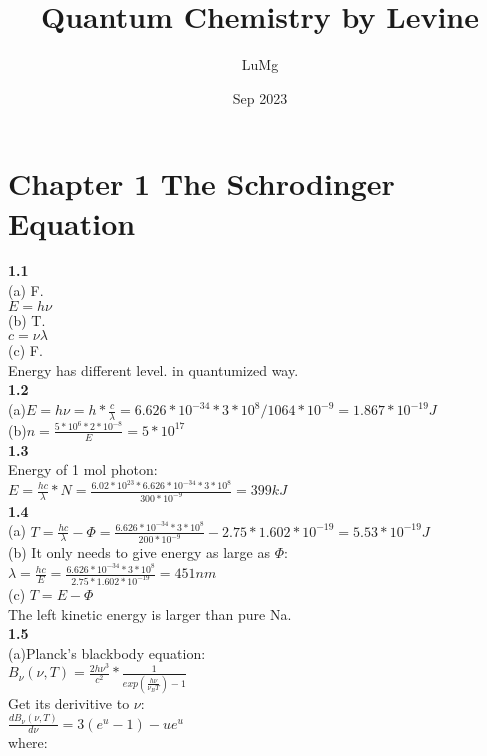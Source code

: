 \documentclass{article}
\title{Quantum Chemistry by Levine}
\author{LuMg}
\date{Sep 2023}
\begin{document}
\maketitle

\section{Chapter 1 The Schrodinger Equation}
\textbf{1.1}\\
(a) F.\\ 
$E = h\nu$\\
(b) T.\\
$c = \nu \lambda$\\
(c) F.\\
Energy has different level. in quantumized way.\\
\newline
\textbf{1.2}\\
(a)$E = h\nu = h*\frac{c}{\lambda} = 6.626*10^{-34}*3*10^8 / 1064*10^{-9} = 1.867*10^{-19}J$\\
(b)$n = \frac{5*10^6*2*10^{-8}}{E} = 5*10^{17}$\\
\newline
\textbf{1.3}\\
Energy of 1 mol photon:\\
$E = \frac{hc}{\lambda}*N = \frac{6.02*10^{23}*6.626*10^{-34}*3*10^8}{300*10^{-9}} = 399kJ$\\
\newline
\textbf{1.4}\\
(a) $T = \frac{hc}{\lambda} - \Phi = \frac{6.626*10^{-34}*3*10^8}{200*10^{-9}} - 2.75*1.602*10^{-19} = 5.53*10^{-19}J$\\
(b) It only needs to give energy as large as $\Phi$:\\
$\lambda = \frac{hc}{E} = \frac{6.626*10^{-34}*3*10^8}{2.75*1.602*10^{-19}} = 451nm$\\
(c) $T = E - \Phi$\\
The left kinetic energy is larger than pure Na.\\
\newline
\textbf{1.5}\\
(a)Planck's blackbody equation:\\
$B_\nu(\nu,T) = \frac{2h\nu^3}{c^2}*\frac{1}{exp(\frac{h\nu}{\nu_BT}) - 1}$\\
Get its derivitive to $\nu$:\\
$\frac{dB_\nu(\nu,T)}{d\nu} = 3(e^u - 1) - ue^u$\\
where:\\
\end{document}
